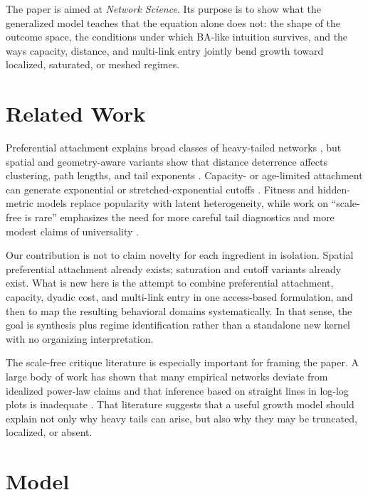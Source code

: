\documentclass[11pt]{article}
\begin{document}
The paper is aimed at \emph{Network Science}. Its purpose is to show what the generalized model teaches that the equation alone does not: the shape of the outcome space, the conditions under which BA-like intuition survives, and the ways capacity, distance, and multi-link entry jointly bend growth toward localized, saturated, or meshed regimes.

\section{Related Work}

Preferential attachment explains broad classes of heavy-tailed networks \citep{barabasi1999emergence}, but spatial and geometry-aware variants show that distance deterrence affects clustering, path lengths, and tail exponents \citep{barthelemy2011spatial}. Capacity- or age-limited attachment can generate exponential or stretched-exponential cutoffs \citep{krapivsky2001organization,bianconi2001competition}. Fitness and hidden-metric models replace popularity with latent heterogeneity, while work on ``scale-free is rare'' emphasizes the need for more careful tail diagnostics and more modest claims of universality \citep{clauset2009power,holme2019rare,broido2019scale,voitalov2019scale}.

Our contribution is not to claim novelty for each ingredient in isolation. Spatial preferential attachment already exists; saturation and cutoff variants already exist. What is new here is the attempt to combine preferential attachment, capacity, dyadic cost, and multi-link entry in one access-based formulation, and then to map the resulting behavioral domains systematically. In that sense, the goal is synthesis plus regime identification rather than a standalone new kernel with no organizing interpretation.

The scale-free critique literature is especially important for framing the paper. A large body of work has shown that many empirical networks deviate from idealized power-law claims and that inference based on straight lines in log-log plots is inadequate \citep{newman2003structure,dorogovtsev2000generic,li2005towards,clauset2009power,golosovsky2017power,broido2019scale,smith2021scarcity}. That literature suggests that a useful growth model should explain not only why heavy tails can arise, but also why they may be truncated, localized, or absent.

\section{Model}
\label{sec:model}
\end{document}
